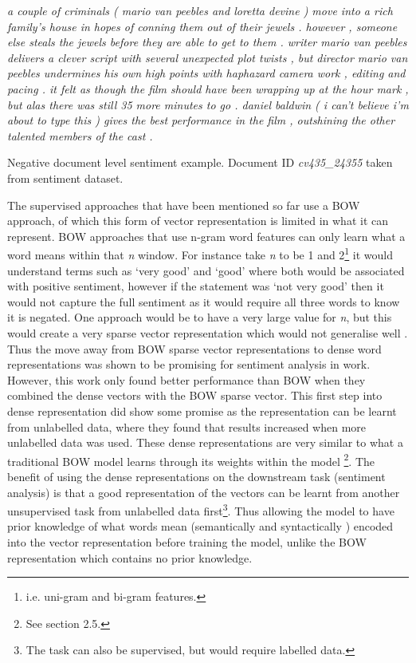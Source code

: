 \begin{example}
\setlength{\parindent}{17pt}
\indent\textit{a couple of criminals ( mario van peebles and loretta devine ) move into a rich family's house in hopes of conning them out of their jewels . however , someone else steals the jewels before they are able to get to them . writer mario van peebles delivers a clever script with several unexpected plot twists , but director mario van peebles undermines his own high points with haphazard camera work , editing and pacing . it felt as though the film should have been wrapping up at the hour mark , but alas there was still 35 more minutes to go . daniel baldwin ( i can't believe i'm about to type this ) gives the best performance in the film , outshining the other talented members of the cast .}
\caption{Negative document level sentiment example. Document ID \textit{cv435\_24355} taken from \citet{pang-etal-2002-thumbs} sentiment dataset.}
\label{example:lit_review_document_sentiment}
\end{example}

The supervised approaches that have been mentioned so far use a BOW approach, of which this form of vector representation is limited in what it can represent. BOW approaches that use n-gram word features can only learn what a word means within that \textit{n} window. For instance take \textit{n} to be 1 and 2\footnote{i.e. uni-gram and bi-gram features.} it would understand terms such as `very good' and `good' where both would be associated with positive sentiment, however if the statement was `not very good' then it would not capture the full sentiment as it would require all three words to know it is negated. One approach would be to have a very large value for \textit{n}, but this would create a very sparse vector representation which would not generalise well \citep{le2014distributed}. Thus the move away from BOW sparse vector representations to dense word representations was shown to be promising for sentiment analysis in \citet{maas-etal-2011-learning} work. However, this work only found better performance than BOW when they combined the dense vectors with the BOW sparse vector. This first step into dense representation did show some promise as the representation can be learnt from unlabelled data, where they found that results increased when more unlabelled data was used. These dense representations are very similar to what a traditional BOW model learns through its weights within the model \citep{goldberg2017neural}\footnote{See section 2.5.}. The benefit of using the dense representations on the downstream task (sentiment analysis) is that a good representation of the vectors can be learnt from another unsupervised task from unlabelled data first\footnote{The task can also be supervised, but would require labelled data.}. Thus allowing the model to have prior knowledge of what words mean (semantically and syntactically \citep{mikolov2013efficient}) encoded into the vector representation before training the model, unlike the BOW representation which contains no prior knowledge. 


